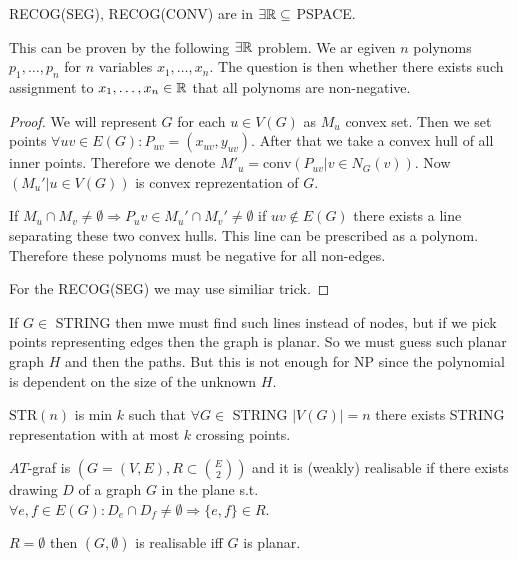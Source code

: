 \begin{thm}
	RECOG(SEG), RECOG(CONV) are in $\exists \mathbb{R} \subseteq$ PSPACE.
\end{thm}

This can be proven by the following $\exists \mathbb{R}$ problem. We ar egiven $n$ polynoms $p_1, \dots, p_n$ for $n$ variables $x_1, \dots, x_n$. The question is then whether there exists such assignment to $x_1, \dots, x_n \in \mathbb{R}$ that all polynoms are non-negative.

\begin{proof}
	We will represent $G$ for each $u \in V(G)$ as $M_u$ convex set. Then we set points $\forall uv \in E(G) : P_{uv} = (x_{uv}, y_{uv})$. After that we take a convex hull of all inner points. Therefore we denote $M'_u = \text{conv}(P_{uv}| v \in N_G(v))$. Now $(M_u' | u \in V(G))$ is convex reprezentation of $G$.
	
	If $M_u \cap M_v \neq \emptyset \Rightarrow P_uv \in M_u' \cap M_v' \neq \emptyset$ if $uv \notin E(G)$ there exists a line separating these two convex hulls. This line can be prescribed as a polynom. Therefore these polynoms must be negative for all non-edges.
	
	For the RECOG(SEG) we may use similiar trick.
\end{proof}

\begin{comm}
	If $G \in$ STRING then mwe must find such lines instead of nodes, but if we pick points representing edges then the graph is planar. So we must guess such planar graph $H$ and then the paths. But this is not enough for NP since the polynomial is dependent on the size of the unknown $H$.
\end{comm}

\begin{defn}
	$\text{STR}(n)$ is min $k$ such that $\forall G \in$ STRING $|V(G)| =n$  there exists STRING representation with at most $k$ crossing points.
\end{defn}

\begin{defn}
	$AT$-graf is $(G = (V,E), R \subset \binom{E}{2})$ and it is (weakly) realisable if there exists drawing $D$ of a graph $G$ in the plane s.t. $\forall e,f \in E(G): D_e \cap D_f \neq \emptyset \Rightarrow \{e,f\} \in R$.
\end{defn}

\begin{observ}
	$R = \emptyset$ then $(G, \emptyset)$ is realisable iff $G$ is planar.
\end{observ}

